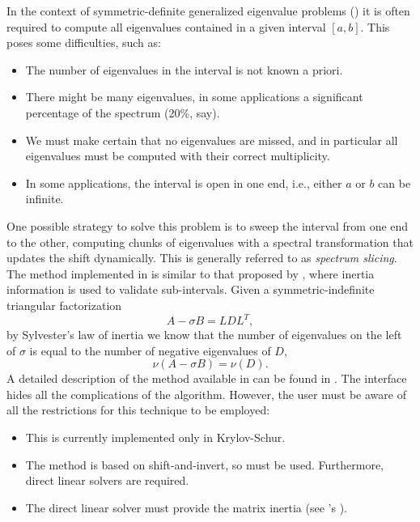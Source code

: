 In the context of symmetric-definite generalized eigenvalue problems () it is often required to compute all eigenvalues contained in a given interval $[a,b]$. This poses some difficulties, such as:
\begin{itemize}
\setlength{\itemsep}{0pt}
\item The number of eigenvalues in the interval is not known a priori.
\item There might be many eigenvalues, in some applications a significant percentage of the spectrum (20\%, say).
\item We must make certain that no eigenvalues are missed, and in particular all eigenvalues must be computed with their correct multiplicity.
\item In some applications, the interval is open in one end, i.e., either $a$ or $b$ can be infinite.
\end{itemize}
One possible strategy to solve this problem is to sweep the interval from one end to the other, computing chunks of eigenvalues with a spectral transformation that updates the shift dynamically. This is generally referred to as \emph{spectrum slicing}. The method implemented in \slepc is similar to that proposed by \cite{Grimes:1994:SBL}, where inertia information is used to validate sub-intervals. Given a symmetric-indefinite triangular factorization
\begin{equation}
A-\sigma B=LDL^T,
\end{equation}
by Sylvester's law of inertia we know that the number of eigenvalues on the left of $\sigma$ is equal to the number of negative eigenvalues of $D$,
\begin{equation}
\nu(A-\sigma B)=\nu(D).
\end{equation}
A detailed description of the method available in \slepc can be found in \citep{Campos:2012:SSS}.
The \slepc interface hides all the complications of the algorithm. However, the user must be aware of all the restrictions for this technique to be employed:
\begin{itemize}
\setlength{\itemsep}{0pt}
\item This is currently implemented only in Krylov-Schur.
\item The method is based on shift-and-invert, so  must be used. Furthermore, direct linear solvers are required.
\item The direct linear solver must provide the matrix inertia (see \petsc's ).
\end{itemize}


